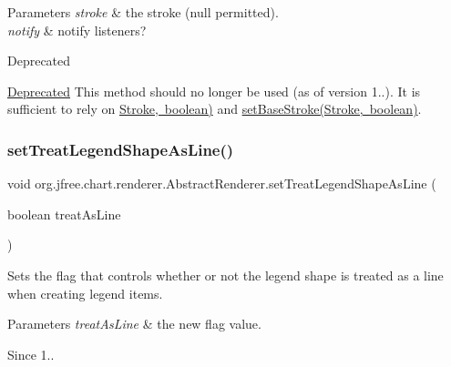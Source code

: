 \begin{DoxyParams}{Parameters}
{\em stroke} & the stroke ({\ttfamily null} permitted). \\
\hline
{\em notify} & notify listeners?\\
\hline
\end{DoxyParams}
\begin{DoxyRefDesc}{Deprecated}
\item[\mbox{\hyperlink{deprecated__deprecated000123}{Deprecated}}]This method should no longer be used (as of version 1..). It is sufficient to rely on \mbox{\hyperlink{}{Stroke, boolean)}} and \mbox{\hyperlink{classorg_1_1jfree_1_1chart_1_1renderer_1_1_abstract_renderer_acd0db81ab3940b3e32648ffdce99ed21}{set\+Base\+Stroke(\+Stroke, boolean)}}. \end{DoxyRefDesc}
\mbox{\label{classorg_1_1jfree_1_1chart_1_1renderer_1_1_abstract_renderer_a0944c12ac3997ba88e158bca1ac60184}} 
\subsubsection{\texorpdfstring{set\+Treat\+Legend\+Shape\+As\+Line()}{setTreatLegendShapeAsLine()}}
{\footnotesize\ttfamily void org.\+jfree.\+chart.\+renderer.\+Abstract\+Renderer.\+set\+Treat\+Legend\+Shape\+As\+Line (\begin{DoxyParamCaption}\item[{boolean}]{treat\+As\+Line }\end{DoxyParamCaption})\hspace{0.3cm}{\ttfamily [protected]}}

Sets the flag that controls whether or not the legend shape is treated as a line when creating legend items.


\begin{DoxyParams}{Parameters}
{\em treat\+As\+Line} & the new flag value.\\
\hline
\end{DoxyParams}
\begin{DoxySince}{Since}
1.. 
\end{DoxySince}


